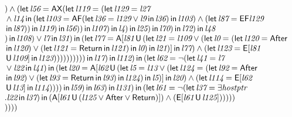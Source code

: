 \documentclass{article}
\newcommand{\U}{\,\mbox{\sf{U}}\,}
\newcommand{\A}{\mbox{\sf{A}}}
\newcommand{\E}{\mbox{\sf{E}}}
\newcommand{\AX}{\mbox{\sf{AX}}}
\newcommand{\AF}{\mbox{\sf{AF}}}
\newcommand{\EF}{\mbox{\sf{EF}}}
\newcommand{\mita}[1]{\mbox{\it{{#1}}}}
\newcommand{\msf}[1]{\mbox{\sf{{#1}}}}
\begin{document}
\[\begin{array}{l}
) \wedge (\mita{\sf{let}} \, \mita{l56} = \AX(\mita{\sf{let}} \, \mita{l119} = (\mita{\sf{let}} \, \mita{l129} = \mita{l27}\\\mbox{} \wedge \mita{l14} \, \mita{\sf{in}} \, (\mita{\sf{let}} \, \mita{l103} = \AF(\mita{\sf{let}} \, \mita{l36} = \mita{l129} \vee \mita{l9} \, \mita{\sf{in}} \, \mita{l36}
) \, \mita{\sf{in}} \, \mita{l103}
) \wedge (\mita{\sf{let}} \, \mita{l87} = \EF\mita{l129}\\\mbox{} \, \mita{\sf{in}} \, \mita{l87}
)
) \, \mita{\sf{in}} \, \mita{l119}
) \, \mita{\sf{in}} \, \mita{l56}
)
) \, \mita{\sf{in}} \, \mita{l107}
) \, \mita{\sf{in}} \, \mita{l4}
) \, \mita{\sf{in}} \, \mita{l25}
) \, \mita{\sf{in}} \, \mita{l70}
) \, \mita{\sf{in}} \, \mita{l72}
) \, \mita{\sf{in}} \, \mita{l48}\\\mbox{}
) \, \mita{\sf{in}} \, \mita{l108}
) \vee \mita{l7} \, \mita{\sf{in}} \, \mita{l31}
) \, \mita{\sf{in}} \, (\mita{\sf{let}} \, \mita{l77} = \A[\mita{l81} \U (\mita{\sf{let}} \, \mita{l21} = \mita{l109} \vee (\mita{\sf{let}} \, \mita{l0} = (\mita{\sf{let}} \, \mita{l120} = \msf{After}\\\mbox{} \, \mita{\sf{in}} \, \mita{l120}
) \vee (\mita{\sf{let}} \, \mita{l121} = \msf{Return} \, \mita{\sf{in}} \, \mita{l121}
) \, \mita{\sf{in}} \, \mita{l0}
) \, \mita{\sf{in}} \, \mita{l21}
)]
 \, \mita{\sf{in}} \, \mita{l77}
) \wedge (\mita{\sf{let}} \, \mita{l123} = \E[\mita{l81}\\\mbox{} \U \mita{l109}]
 \, \mita{\sf{in}} \, \mita{l123}
)
)
)
)
)
)
)
)
)
) \, \mita{\sf{in}} \, \mita{l17}
) \, \mita{\sf{in}} \, \mita{l112}
) \, \mita{\sf{in}} \, (\mita{\sf{let}} \, \mita{l62} = \neg (\mita{\sf{let}} \, \mita{l41} = \mita{l7}\\\mbox{} \vee \mita{l22} \, \mita{\sf{in}} \, \mita{l41}
) \, \mita{\sf{in}} \, (\mita{\sf{let}} \, \mita{l20} = \A[\mita{l62} \U (\mita{\sf{let}} \, \mita{l5} = \mita{l13} \vee (\mita{\sf{let}} \, \mita{l124} = (\mita{\sf{let}} \, \mita{l92} = \msf{After}\\\mbox{} \, \mita{\sf{in}} \, \mita{l92}
) \vee (\mita{\sf{let}} \, \mita{l93} = \msf{Return} \, \mita{\sf{in}} \, \mita{l93}
) \, \mita{\sf{in}} \, \mita{l124}
) \, \mita{\sf{in}} \, \mita{l5}
)]
 \, \mita{\sf{in}} \, \mita{l20}
) \wedge (\mita{\sf{let}} \, \mita{l114} = \E[\mita{l62}\\\mbox{} \U \mita{l13}]
 \, \mita{\sf{in}} \, \mita{l114}
)
)
)
) \, \mita{\sf{in}} \, \mita{l59}
) \, \mita{\sf{in}} \, \mita{l63}
) \, \mita{\sf{in}} \, \mita{l131}
) \, \mita{\sf{in}} \, (\mita{\sf{let}} \, \mita{l61} = \neg (\mita{\sf{let}} \, \mita{l37} = \exists \mita{hostptr}\\\mbox{} . \mita{l22} \, \mita{\sf{in}} \, \mita{l37}
) \, \mita{\sf{in}} \, (\A[\mita{l61} \U (\mita{l125} \vee \msf{After} \vee \msf{Return})]
) \wedge (\E[\mita{l61} \U \mita{l125}]
)
)
)
))\\\mbox{}
))))
\end{array}\]
\end{document}
